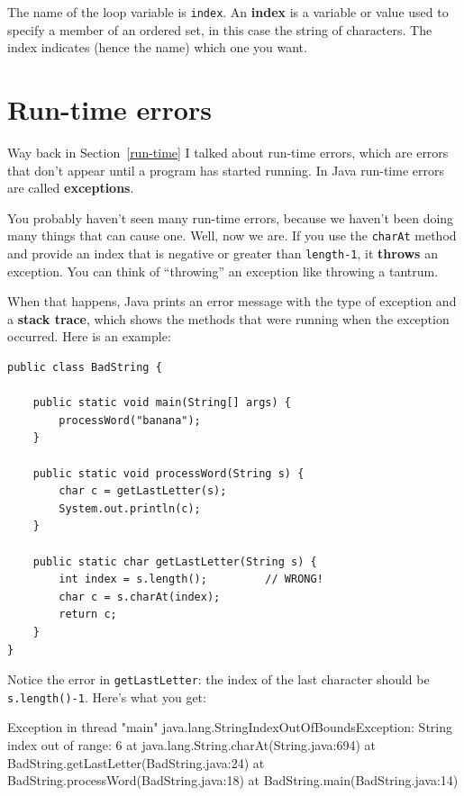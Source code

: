 \documentclass[12pt]{book}
\theoremstyle{exercise}
\begin{document}

The name of the loop variable is {\tt index}.  An {\bf
index} is a variable or value used to specify a member of an ordered
set, in this case the string of characters.  The index
indicates (hence the name) which one you want.

\section{Run-time errors}
\label{StringIndexOutOfBounds}

Way back in Section~\ref{run-time} I talked about run-time errors,
which are errors that don't appear until a program has started
running.  In Java run-time errors are called {\bf exceptions}.

You probably haven't seen many run-time errors, because we
haven't been doing many things that can cause one.  Well, now we are.
If you use the {\tt charAt} method and provide an index that is
negative or greater than {\tt length-1}, it {\bf throws} an exception.
You can think of ``throwing'' an exception like throwing
a tantrum.

When that happens, Java prints an error message with
the type of exception and a {\bf stack trace}, which shows the methods
that were running when the exception occurred.  Here is an example:

\begin{lstlisting}
public class BadString {

    public static void main(String[] args) {
        processWord("banana");
    }

    public static void processWord(String s) {
        char c = getLastLetter(s);
        System.out.println(c);
    }

    public static char getLastLetter(String s) {
        int index = s.length();         // WRONG!
        char c = s.charAt(index);
        return c;
    }
}
\end{lstlisting}

Notice the error in {\tt getLastLetter}: the index of the last
character should be {\tt s.length()-1}.  Here's what you get:

\begin{verbatimtab}
Exception in thread "main" java.lang.StringIndexOutOfBoundsException:
String index out of range: 6
        at java.lang.String.charAt(String.java:694)
        at BadString.getLastLetter(BadString.java:24)
        at BadString.processWord(BadString.java:18)
        at BadString.main(BadString.java:14)
\end{verbatimtab}
\end{document}
